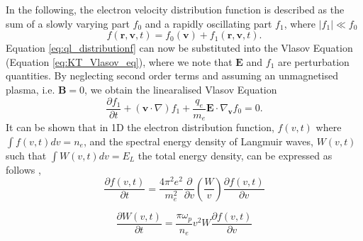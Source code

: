 In the following, the electron velocity distribution function is described as the sum of a slowly varying part $f_0$ and a rapidly oscillating part $f_1$, where $\vert f_1 \vert \ll f_0$
\begin{equation}
\label{eq:ql_distributionf}
f(\mathbf{r}, \mathbf{v}, t) = f_0(\mathbf{v}) + f_1(\mathbf{r}, \mathbf{v}, t).
\end{equation} 
Equation \ref{eq:ql_distributionf} can now be substituted into the Vlasov Equation (Equation \ref{eq:KT_Vlasov_eq}), where we note that $\mathbf{E}$ and $f_1$ are perturbation quantities. By neglecting second order terms and assuming an unmagnetised plasma, i.e. $\mathbf{B} = 0$, we obtain the linearalised Vlasov Equation
\begin{equation}
\label{eq:linear_vlasov}
\frac{\partial f_1}{\partial t} + (\mathbf{v} \cdot \nabla)f_1 + \frac{q_e}{m_e} \mathbf{E} \cdot \nabla_\mathbf{v}f_0 = 0.
\end{equation} 
It can be shown that in 1D the electron distribution function, $f(v,t)$ where $\int f(v,t) dv = n_e$, and the spectral energy density of Langmuir waves, $W(v,t)$ such that $\int W(v,t) dv = E_L$ the total energy density, can be expressed as follows \citep{Vedenov1963,Reid2014},
\begin{equation}\label{eq:dfdt}
    \frac{\partial f(v,t)}{\partial t}=\frac{4 \pi^2 e^2}{m_e^2} \frac{\partial}{\partial v} \left( \frac{W}{v} \right) \frac{\partial f(v,t)}{\partial v}
\end{equation}

\begin{equation}\label{eq:dWdt}
    \frac{\partial W(v,t)}{\partial t}= \frac{\pi \omega_p}{n_e} v^2 W \frac{\partial f(v,t)}{\partial v}
\end{equation}

